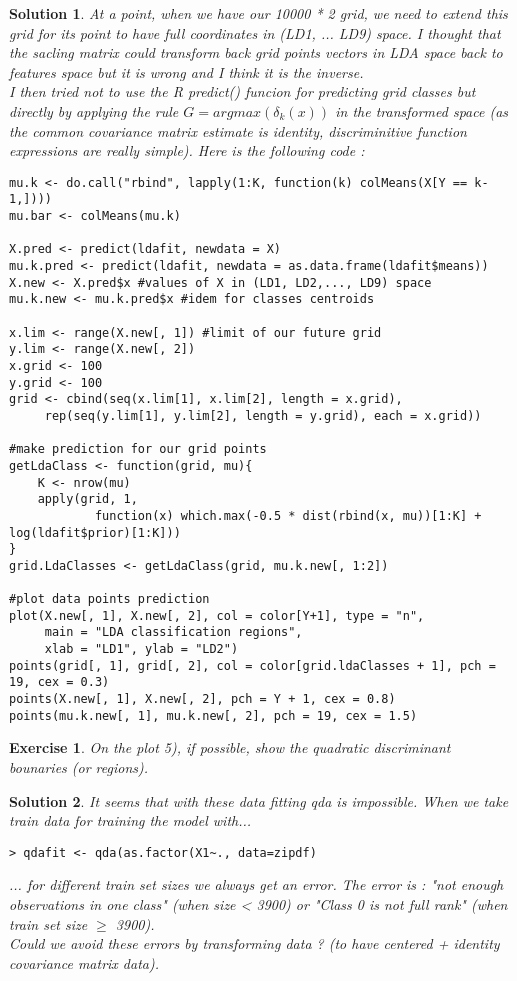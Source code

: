 \documentclass[12pt,a4paper]{article}
\newtheorem{exercise}{Exercise}
\newtheorem{solution}{Solution}
\begin{document}
\begin{solution}
At a point, when we have our 10000 * 2 grid, we need to extend this grid for its point to have full coordinates in (LD1, ... LD9) space. I thought that the sacling matrix could transform back grid points vectors in LDA space back to features space but it is wrong and I think it is the inverse.\\

I then tried not to use the R predict() funcion for predicting grid classes but directly by applying the rule $G = argmax(\delta_k(x))$ in the transformed space (as the common covariance matrix estimate is identity, discriminitive function expressions are really simple). Here is the following code : 

\begin{verbatim}
mu.k <- do.call("rbind", lapply(1:K, function(k) colMeans(X[Y == k-1,])))
mu.bar <- colMeans(mu.k)

X.pred <- predict(ldafit, newdata = X) 
mu.k.pred <- predict(ldafit, newdata = as.data.frame(ldafit$means))
X.new <- X.pred$x #values of X in (LD1, LD2,..., LD9) space 
mu.k.new <- mu.k.pred$x #idem for classes centroids

x.lim <- range(X.new[, 1]) #limit of our future grid
y.lim <- range(X.new[, 2])
x.grid <- 100
y.grid <- 100
grid <- cbind(seq(x.lim[1], x.lim[2], length = x.grid),
	 rep(seq(y.lim[1], y.lim[2], length = y.grid), each = x.grid))

#make prediction for our grid points
getLdaClass <- function(grid, mu){
    K <- nrow(mu)
    apply(grid, 1, 
    		function(x) which.max(-0.5 * dist(rbind(x, mu))[1:K] + log(ldafit$prior)[1:K]))
}
grid.LdaClasses <- getLdaClass(grid, mu.k.new[, 1:2])

#plot data points prediction
plot(X.new[, 1], X.new[, 2], col = color[Y+1], type = "n",
	 main = "LDA classification regions", 
	 xlab = "LD1", ylab = "LD2")
points(grid[, 1], grid[, 2], col = color[grid.ldaClasses + 1], pch = 19, cex = 0.3)
points(X.new[, 1], X.new[, 2], pch = Y + 1, cex = 0.8)
points(mu.k.new[, 1], mu.k.new[, 2], pch = 19, cex = 1.5)
\end{verbatim}
\end{solution}

\begin{exercise}
On the plot 5), if possible, show the quadratic discriminant bounaries (or regions).
\end{exercise}

\begin{solution}
It seems that with these data fitting qda is impossible. When we take train data for training the model with...
\begin{verbatim}
> qdafit <- qda(as.factor(X1~., data=zipdf)
\end{verbatim}
... for different train set sizes we always get an error. The error is : "not enough observations in one class" (when size < 3900) or "Class 0 is not full rank" (when train set size $\geq$ 3900).\\

Could we avoid these errors by transforming data ? (to have centered + identity covariance matrix data).
\end{solution}
\end{document}
